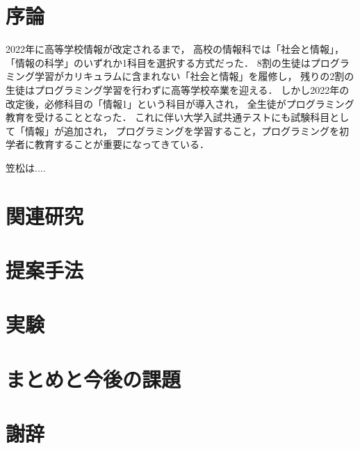 \documentclass[12pt,a4j]{jreport}
\newcommand{\todo}[1]{{\bf \color{red}{TODO: #1}}}
\begin{document}
\setcounter{page}{1} 
\pagestyle{plain}

\chapter{序論}\label{chap:intro}


2022年に高等学校情報\todo{文科省のweb pageで確認}が改定されるまで，
高校の情報科では「社会と情報」，「情報の科学」のいずれか1科目を選択する方式だった．
8割の生徒はプログラミング学習がカリキュラムに含まれない「社会と情報」を履修し，
残りの2割の生徒はプログラミング学習を行わずに高等学校卒業を迎える．
しかし2022年の改定後，必修科目の「情報1\todo{確認}」という科目が導入され，
全生徒がプログラミング教育を受けることとなった．
これに伴い大学入試共通テストにも試験科目として「情報」が追加され，
プログラミングを学習すること，プログラミングを初学者に教育することが重要になってきている．

笠松\cite{Kasa25}は....
\todo{次回までに、卒論5ページ、参考文献10本にする。}




\chapter{関連研究}\label{chap:related}




\chapter{提案手法}\label{chap:proposal}



\chapter{実験}\label{chap:experiment}

\chapter{まとめと今後の課題}\label{chap:summary}

\chapter*{謝辞}



\end{document}
